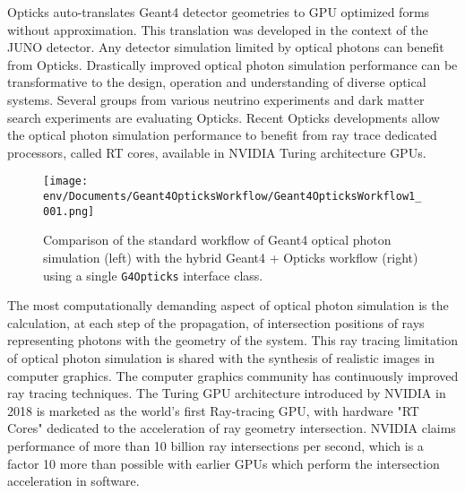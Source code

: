 \documentclass{webofc}
\begin{document}
Opticks auto-translates Geant4 detector geometries to GPU optimized forms without
approximation. This translation was developed in the context of the JUNO detector. 
%
Any detector simulation limited by optical photons 
can benefit from Opticks.
Drastically improved optical photon simulation performance can be transformative 
to the design, operation and understanding of diverse optical systems.
%
Several groups from various neutrino experiments and dark matter search experiments are 
evaluating Opticks.
%
Recent Opticks developments allow the optical photon simulation performance 
to benefit from ray trace dedicated processors, called RT cores\cite{rtx}, 
available in NVIDIA Turing architecture GPUs.
%
%
\begin{figure}
\centering
\texttt{[image: env/Documents/Geant4OpticksWorkflow/Geant4OpticksWorkflow1\_001.png]}
\caption{Comparison of the standard workflow of Geant4 optical photon simulation (left) with the hybrid Geant4 + Opticks workflow (right)
using a single {\tt G4Opticks} interface class.
}
\label{workflow} 
\end{figure}
%
%
%

The most computationally demanding aspect of optical photon simulation 
is the calculation, at each step of the propagation, 
of intersection positions of rays representing photons with the geometry of the system.
This ray tracing limitation of optical photon simulation is shared 
with the synthesis of realistic images in computer graphics. 
The computer graphics community has continuously improved ray tracing techniques. The Turing GPU architecture 
introduced by NVIDIA in 2018 is marketed as the world's first Ray-tracing GPU, with   
hardware "RT Cores" 
dedicated to the 
acceleration of ray geometry intersection.
NVIDIA claims performance of more than 10 billion ray intersections 
per second, which is a factor 10 more than possible with earlier GPUs
which perform the intersection acceleration in software. 
%
%
\label{secworkflow}
%
\end{document}
